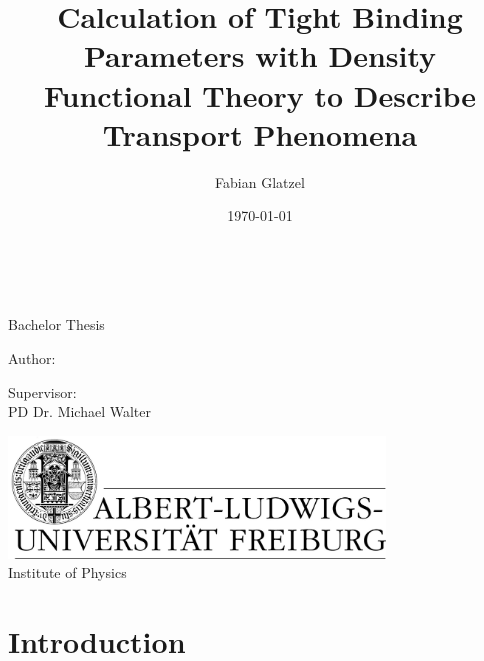 \documentclass[english,a4paper,10pt,twoside, headsepline, bibliography=totocnumbered, listof=totocnumbered]{scrbook}
\author{Fabian Glatzel}
\title{Calculation of Tight Binding Parameters with Density Functional Theory to Describe Transport Phenomena}
\date{\today}
\begin{document}
\begin{titlepage}
\centering 
\Huge\thetitle\\ 
 
\vspace*{1cm}
 
\Large Bachelor Thesis\\
\vspace*{2cm}
\begin{minipage}{0.49\textwidth}
Author:\\
\theauthor
\end{minipage}
\begin{minipage}{0.49\textwidth}
\begin{flushright}
Supervisor:\\
PD Dr. Michael Walter	
\end{flushright}
\end{minipage}
\vspace*{2cm}
 
\includegraphics[width=10cm]{Images/logo_freiburg}\\
Institute of Physics\\
\vspace*{5cm}
\thedate
\normalsize 
\end{titlepage}


\tableofcontents
{}

\chapter{Introduction}



\listoffigures


\end{document}
